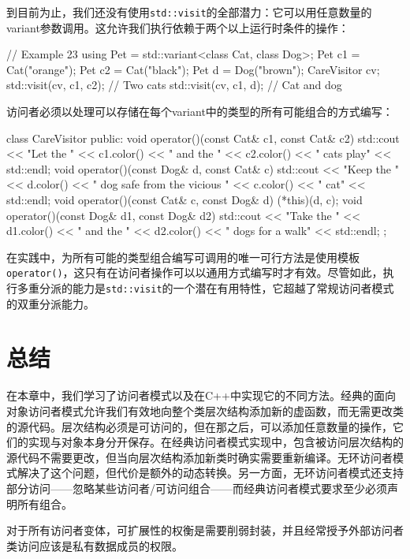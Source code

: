 \begin{code}
{到目前为止，我们还没有使用\texttt{std::visit}的全部潜力：它可以用任意数量的variant参数调用。这允许我们执行依赖于两个以上运行时条件的操作：

\begin{code}
// Example 23
using Pet = std::variant<class Cat, class Dog>;
Pet c1 = Cat("orange");
Pet c2 = Cat("black");
Pet d = Dog("brown");
CareVisitor cv;
std::visit(cv, c1, c2);      // Two cats
std::visit(cv, c1, d);     // Cat and dog
\end{code}

访问者必须以处理可以存储在每个variant中的类型的所有可能组合的方式编写：

\begin{code}
class CareVisitor {
  public:
  void operator()(const Cat& c1, const Cat& c2) {
    std::cout << "Let the " << c1.color() << " and the "
              << c2.color() << " cats play" << std::endl; }
  void operator()(const Dog& d, const Cat& c) {
    std::cout << "Keep the " << d.color()
              << " dog safe from the vicious " << c.color()
              << " cat" << std::endl; }
  void operator()(const Cat& c, const Dog& d) {
    (*this)(d, c);
  }
  void operator()(const Dog& d1, const Dog& d2) {
    std::cout << "Take the " << d1.color() << " and the "
              << d2.color() << " dogs for a walk"
              << std::endl; }
};
\end{code}

在实践中，为所有可能的类型组合编写可调用的唯一可行方法是使用模板\texttt{operator()}，这只有在访问者操作可以以通用方式编写时才有效。尽管如此，执行多重分派的能力是\texttt{std::visit}的一个潜在有用特性，它超越了常规访问者模式的双重分派能力。

\section{总结}

在本章中，我们学习了访问者模式以及在C++中实现它的不同方法。经典的面向对象访问者模式允许我们有效地向整个类层次结构添加新的虚函数，而无需更改类的源代码。层次结构必须是可访问的，但在那之后，可以添加任意数量的操作，它们的实现与对象本身分开保存。在经典访问者模式实现中，包含被访问层次结构的源代码不需要更改，但当向层次结构添加新类时确实需要重新编译。无环访问者模式解决了这个问题，但代价是额外的动态转换。另一方面，无环访问者模式还支持部分访问——忽略某些访问者/可访问组合——而经典访问者模式要求至少必须声明所有组合。

对于所有访问者变体，可扩展性的权衡是需要削弱封装，并且经常授予外部访问者类访问应该是私有数据成员的权限。

}
\end{code}
